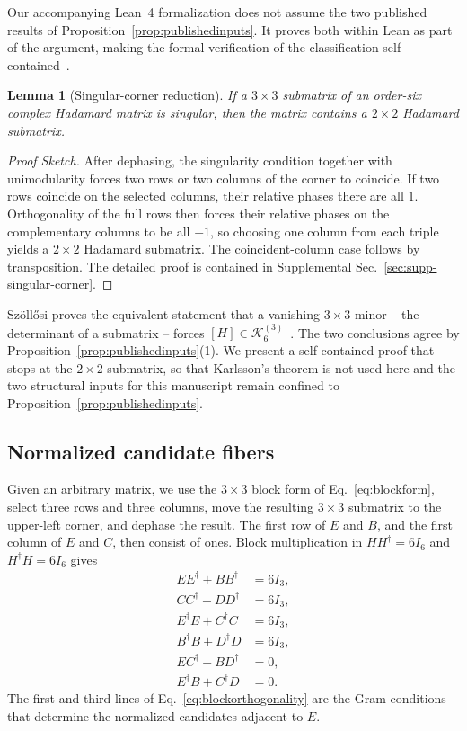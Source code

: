 \documentclass[aps,prx,reprint,nofootinbib,twoside,superscriptaddress,longbibliography,floatfix]{revtex4-2}
\newtheorem{lemma}[theorem]{Lemma}
\theoremstyle{definition}
\newcommand{\KK}{\mathcal K}
\begin{document}
Our accompanying Lean~4 formalization \cite{CardenesWuttig2026HadamardRepository} does not assume the two published results of Proposition~\ref{prop:publishedinputs}. It proves both within Lean as part of the argument, making the formal verification of the classification self-contained~\cite{CardenesWuttig2026HadamardRepository}.

\begin{lemma}[Singular-corner reduction]
\label{lem:singularcorner}
If a $3\times3$ submatrix of an order-six complex Hadamard matrix is singular, then the matrix contains a $2\times2$ Hadamard submatrix.
\end{lemma}

\begin{proof}[Proof Sketch]
After dephasing, the singularity condition together with unimodularity forces two rows or two columns of the corner to coincide. If two rows coincide on the selected columns, their relative phases there are all $1$. Orthogonality of the full rows then forces their relative phases on the complementary columns to be all $-1$, so choosing one column from each triple yields a $2\times2$ Hadamard submatrix. The coincident-column case follows by transposition. The detailed proof is contained in Supplemental Sec.~\ref{sec:supp-singular-corner}.
\end{proof}

Sz\"oll\H{o}si proves the equivalent statement that a vanishing $3\times3$ minor -- the determinant of a submatrix -- forces
$[H]\in\KK_6^{(3)}$~\cite{Szollosi2012FourParameter}. The two conclusions agree by Proposition~\ref{prop:publishedinputs}(1).
We present a self-contained proof that stops at the $2\times2$ submatrix, so that Karlsson's theorem is not used here and the two structural inputs for this manuscript remain confined to Proposition~\ref{prop:publishedinputs}.

\subsection{Normalized candidate fibers}
Given an arbitrary matrix, we use the $3\times3$ block form of Eq.~\eqref{eq:blockform}, select three rows and three columns, move the resulting $3\times3$ submatrix to the upper-left corner, and dephase the result.
The first row of $E$ and $B$, and the first column of $E$ and $C$, then consist of ones. Block multiplication in $HH^{\dagger}=6I_6$ and
$H^{\dagger}H=6I_6$ gives
\begin{equation}
\begin{aligned}
EE^{\dagger}+BB^{\dagger}&=6I_3,\\
CC^{\dagger}+DD^{\dagger}&=6I_3,\\
E^{\dagger}E+C^{\dagger}C&=6I_3,\\
B^{\dagger}B+D^{\dagger}D&=6I_3,\\
EC^{\dagger}+BD^{\dagger}&=0,\\
E^{\dagger}B+C^{\dagger}D&=0.
\end{aligned}
\label{eq:blockorthogonality}
\end{equation}
The first and third lines of Eq.~\eqref{eq:blockorthogonality} are the Gram conditions that determine the normalized candidates adjacent to $E$.
\end{document}
